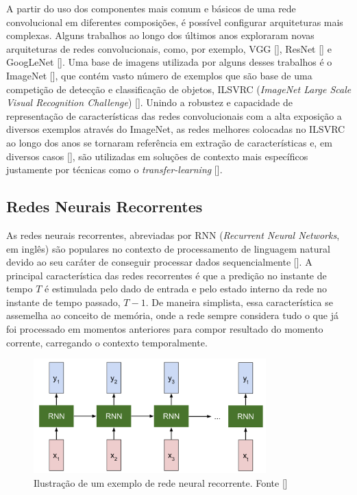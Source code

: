 A partir do uso dos componentes mais comum e básicos de uma rede convolucional em diferentes composições, é possível configurar arquiteturas mais complexas. 
Alguns trabalhos ao longo dos últimos anos exploraram novas arquiteturas de redes convolucionais, como, por exemplo, VGG [], 
ResNet [] e GoogLeNet []. Uma base de imagens utilizada por alguns desses trabalhos é o ImageNet 
[], que contém vasto número de exemplos que são base de uma competição de detecção e classificação de objetos, ILSVRC 
(\textit{ImageNet Large Scale Visual Recognition Challenge}) []. Unindo a robustez e capacidade de representação de características das 
redes convolucionais com a alta exposição a diversos exemplos através do ImageNet, as redes melhores colocadas no ILSVRC ao longo dos anos se tornaram 
referência em extração de características e, em diversos casos [], são utilizadas em soluções de contexto mais específicos justamente 
por técnicas como o \textit{transfer-learning} [].


\subsection{Redes Neurais Recorrentes}
As redes neurais recorrentes, abreviadas por RNN (\textit{Recurrent Neural Networks}, em inglês) são populares no contexto de processamento de 
linguagem natural devido ao seu caráter de conseguir processar dados sequencialmente []. A principal característica das redes recorrentes 
é que a predição no instante de tempo $T$ é estimulada pelo dado de entrada e pelo estado interno da rede no instante de tempo passado, $T - 1$. De maneira 
simplista, essa característica se assemelha ao conceito de memória, onde a rede sempre considera tudo o que já foi processado em momentos anteriores para 
compor resultado do momento corrente, carregando o contexto temporalmente.

\begin{figure}
    \centering
    \includegraphics[width=0.8\textwidth]{figs/theory-example-rnn.png}
    \caption{Ilustração de um exemplo de rede neural recorrente. Fonte []}
    \label{fig:theory-rnn-example}
\end{figure}

